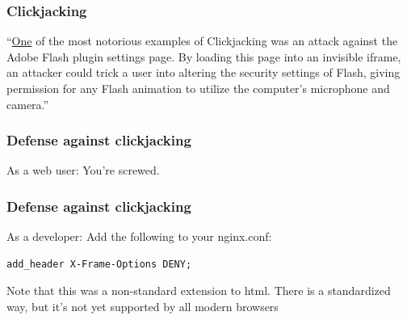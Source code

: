 \documentclass[9pt]{beamer}
\begin{document}
\begin{frame}
\frametitle{Clickjacking}
``\href{https://www.owasp.org/index.php/Clickjacking}{One} of the most notorious examples of Clickjacking was an attack against the Adobe Flash plugin settings page. By loading this page into an invisible iframe, an attacker could trick a user into altering the security settings of Flash, giving permission for any Flash animation to utilize the computer's microphone and camera.''
\end{frame}

\begin{frame}
\frametitle{Defense against clickjacking}
As a web user: You're screwed.
\end{frame}

\begin{frame}[fragile]
\frametitle{Defense against clickjacking}

As a developer: Add the following to your nginx.conf:
\begin{verbatim}
add_header X-Frame-Options DENY;
\end{verbatim}
Note that this was a non-standard extension to html. There is a standardized way, but it's not yet supported by all modern browsers
\end{frame}
\end{document}
